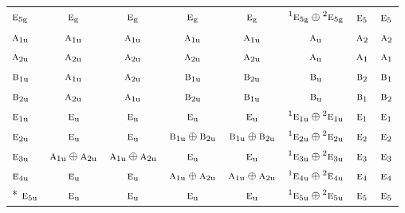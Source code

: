 \documentclass[10pt,a4paper]{article}
\numberwithin{equation}{section}
\newcommand{\irr}[1]{\text{\normalfont\scshape #1}}
\newcommand{\conjpair}[1]{{}^{#1}}
\newcommand{\ptag}[1]{\mathrm{#1}}
\begin{document}
{\begin{longtable}{@{}lccccccc@{}}
$\irr{e}_{5\ptag{g}}$ & $\irr{e}_{\ptag{g}}$ & $\irr{e}_{\ptag{g}}$ & $\irr{e}_{\ptag{g}}$ & $\irr{e}_{\ptag{g}}$ & $\conjpair{1}\irr{e}_{5\ptag{g}}\oplus \conjpair{2}\irr{e}_{5\ptag{g}}$ & $\irr{e}_{5}$ & $\irr{e}_{5}$\\
$\irr{a}_{1\ptag{u}}$ & $\irr{a}_{1\ptag{u}}$ & $\irr{a}_{1\ptag{u}}$ & $\irr{a}_{1\ptag{u}}$ & $\irr{a}_{1\ptag{u}}$ & $\irr{a}_{\ptag{u}}$ & $\irr{a}_{2}$ & $\irr{a}_{2}$\\
$\irr{a}_{2\ptag{u}}$ & $\irr{a}_{2\ptag{u}}$ & $\irr{a}_{2\ptag{u}}$ & $\irr{a}_{2\ptag{u}}$ & $\irr{a}_{2\ptag{u}}$ & $\irr{a}_{\ptag{u}}$ & $\irr{a}_{1}$ & $\irr{a}_{1}$\\
$\irr{b}_{1\ptag{u}}$ & $\irr{a}_{1\ptag{u}}$ & $\irr{a}_{2\ptag{u}}$ & $\irr{b}_{1\ptag{u}}$ & $\irr{b}_{2\ptag{u}}$ & $\irr{b}_{\ptag{u}}$ & $\irr{b}_{2}$ & $\irr{b}_{1}$\\
$\irr{b}_{2\ptag{u}}$ & $\irr{a}_{2\ptag{u}}$ & $\irr{a}_{1\ptag{u}}$ & $\irr{b}_{2\ptag{u}}$ & $\irr{b}_{1\ptag{u}}$ & $\irr{b}_{\ptag{u}}$ & $\irr{b}_{1}$ & $\irr{b}_{2}$\\
$\irr{e}_{1\ptag{u}}$ & $\irr{e}_{\ptag{u}}$ & $\irr{e}_{\ptag{u}}$ & $\irr{e}_{\ptag{u}}$ & $\irr{e}_{\ptag{u}}$ & $\conjpair{1}\irr{e}_{1\ptag{u}}\oplus \conjpair{2}\irr{e}_{1\ptag{u}}$ & $\irr{e}_{1}$ & $\irr{e}_{1}$\\
$\irr{e}_{2\ptag{u}}$ & $\irr{e}_{\ptag{u}}$ & $\irr{e}_{\ptag{u}}$ & $\irr{b}_{1\ptag{u}}\oplus \irr{b}_{2\ptag{u}}$ & $\irr{b}_{1\ptag{u}}\oplus \irr{b}_{2\ptag{u}}$ & $\conjpair{1}\irr{e}_{2\ptag{u}}\oplus \conjpair{2}\irr{e}_{2\ptag{u}}$ & $\irr{e}_{2}$ & $\irr{e}_{2}$\\
$\irr{e}_{3\ptag{u}}$ & $\irr{a}_{1\ptag{u}}\oplus \irr{a}_{2\ptag{u}}$ & $\irr{a}_{1\ptag{u}}\oplus \irr{a}_{2\ptag{u}}$ & $\irr{e}_{\ptag{u}}$ & $\irr{e}_{\ptag{u}}$ & $\conjpair{1}\irr{e}_{3\ptag{u}}\oplus \conjpair{2}\irr{e}_{3\ptag{u}}$ & $\irr{e}_{3}$ & $\irr{e}_{3}$\\
$\irr{e}_{4\ptag{u}}$ & $\irr{e}_{\ptag{u}}$ & $\irr{e}_{\ptag{u}}$ & $\irr{a}_{1\ptag{u}}\oplus \irr{a}_{2\ptag{u}}$ & $\irr{a}_{1\ptag{u}}\oplus \irr{a}_{2\ptag{u}}$ & $\conjpair{1}\irr{e}_{4\ptag{u}}\oplus \conjpair{2}\irr{e}_{4\ptag{u}}$ & $\irr{e}_{4}$ & $\irr{e}_{4}$\\*
$\irr{e}_{5\ptag{u}}$ & $\irr{e}_{\ptag{u}}$ & $\irr{e}_{\ptag{u}}$ & $\irr{e}_{\ptag{u}}$ & $\irr{e}_{\ptag{u}}$ & $\conjpair{1}\irr{e}_{5\ptag{u}}\oplus \conjpair{2}\irr{e}_{5\ptag{u}}$ & $\irr{e}_{5}$ & $\irr{e}_{5}$\\
\bottomrule\end{longtable}}
\end{document}
